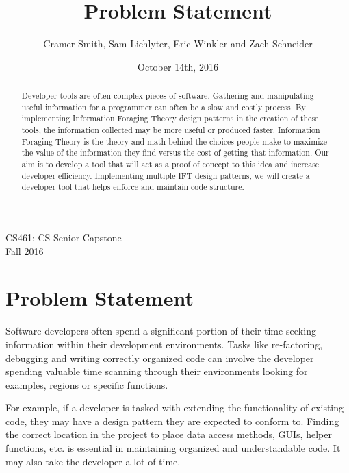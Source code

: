 \documentclass[letterpaper,10pt,titlepage,draftclsnofoot,onecolumn] {IEEEtran}
\title{Problem Statement}
\author{Cramer Smith, Sam Lichlyter, Eric Winkler and Zach Schneider}
\date{October 14th, 2016}
\begin{document}
\begin{titlepage}

\maketitle
\begin{center}
CS461: CS Senior Capstone \\
Fall 2016

\begin{abstract}

Developer tools are often complex pieces of software. Gathering and manipulating useful information for a programmer can often be a slow and costly process. By implementing Information Foraging Theory design patterns in the creation of these tools, the information collected may be more useful or produced faster. Information Foraging Theory is the theory and math behind the choices people make to maximize the value of the information they find versus the cost of getting that information. Our aim is to develop a tool that will act as a proof of concept to this idea and increase developer efficiency. Implementing multiple IFT design patterns, we will create a developer tool that helps enforce and maintain code structure. 

\end{abstract}

\end{center}

\end{titlepage}

\section{Problem Statement}

Software developers often spend a significant portion of their time seeking information within their development environments. 
Tasks like re-factoring, debugging and writing correctly organized code can involve the developer spending valuable time scanning through their environments looking for examples, regions or specific functions.

\bigskip
For example, if a developer is tasked with extending the functionality of existing code, they may have a design pattern they are expected to conform to. 
Finding the correct location in the project to place data access methods, GUIs, helper functions, etc. is essential in maintaining organized and understandable code. 
It may also take the developer a lot of time.
\end{document}
